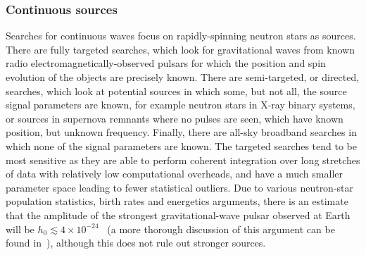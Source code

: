 \subsubsection{Continuous sources}

Searches for continuous waves focus on rapidly-spinning neutron stars as sources. There are fully targeted 
searches, which look for gravitational waves from known radio electromagnetically-observed pulsars for which 
the position and spin evolution of the objects are precisely known. There are semi-targeted, or directed, 
searches, which look at potential sources in which some, but not all, the source signal parameters are known, 
for example neutron stars in X-ray binary systems, or sources in supernova remnants where no pulses are seen, 
which have known position, but unknown frequency. Finally, there are all-sky broadband searches in which none 
of the signal parameters are known. The targeted searches tend to be most sensitive as they are able to 
perform coherent integration over long stretches of data with relatively low computational overheads, and 
have a much smaller parameter space leading to fewer statistical outliers. Due to various neutron-star 
population statistics, birth rates and energetics arguments, there is an estimate that the amplitude of the 
strongest gravitational-wave pulsar observed at Earth will be $h_0 \lesssim 
4\times10^{-24}$~\cite{Abbott:2007a} (a more thorough discussion of this argument can be found 
in~\cite{Knispel:2008}), although this does not rule out stronger sources.

